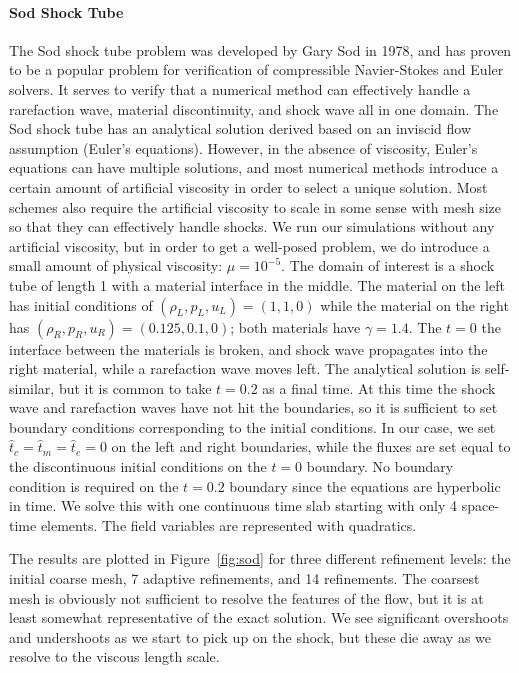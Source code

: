 \documentclass[preprint,12pt]{elsarticle}
\begin{document}
\paragraph{Sod Shock Tube}
The Sod shock tube problem was developed by Gary Sod in 1978\cite{Sod1978}, and has proven to be a popular problem for verification 
of compressible Navier-Stokes and Euler solvers.
It serves to verify that a numerical method can effectively handle a rarefaction wave, material discontinuity, and shock wave
all in one domain.
The Sod shock tube has an analytical solution derived based on an inviscid flow assumption (Euler's equations).
However, in the absence of viscosity, Euler's equations can have multiple solutions, and most numerical methods introduce a certain amount of
artificial viscosity in order to select a unique solution.
Most schemes also require the artificial viscosity to scale in some sense with mesh size so that they can effectively handle shocks.
We run our simulations without any artificial viscosity, but in order to get a well-posed problem, we do introduce a small amount of physical
viscosity: $\mu=10^{-5}$.
The domain of interest is a shock tube of length 1 with a material interface in the middle. The material on the left has initial conditions of 
$(\rho_L,p_L,u_L)=(1,1,0)$ while the material on the right has $(\rho_R,p_R,u_R)=(0.125,0.1,0)$; both materials have $\gamma=1.4$. 
The $t=0$ the interface between the materials is broken, 
and shock wave propagates into the right material, while a rarefaction wave moves left. The analytical solution is self-similar, but it is common to take
$t=0.2$ as a final time.
At this time the shock wave and rarefaction waves have not hit the boundaries, 
so it is sufficient to set boundary conditions corresponding to the initial conditions.
In our case, we set $\hat t_c=\hat t_m=\hat t_e=0$ on the left and right boundaries, while the fluxes are set equal to the discontinuous
initial conditions on the $t=0$ boundary. 
No boundary condition is required on the $t=0.2$ boundary since the equations are hyperbolic in time.
We solve this with one continuous time slab starting with only 4 space-time elements.
The field variables are represented with quadratics.

The results are plotted in Figure~\ref{fig:sod} for three different refinement levels: the initial coarse mesh, 7 adaptive refinements, and 14 refinements.
The coarsest mesh is obviously not sufficient to resolve the features of the flow, but it is at least somewhat representative of the exact solution.
We see significant overshoots and undershoots as we start to pick up on the shock, but these die away as we resolve to the viscous length scale.
\end{document}
